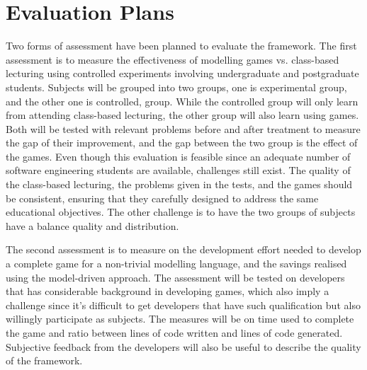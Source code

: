 \documentclass[conference]{IEEEtran}
\begin{document}
\section{Evaluation Plans}
\label{Evaluation Plans}
Two forms of assessment have been planned to evaluate the framework. The first assessment is to measure the effectiveness of modelling games vs. class-based lecturing using controlled experiments involving undergraduate and postgraduate students. Subjects will be grouped into two groups, one is experimental group, and the other one is controlled, group. While the controlled group will only learn from attending class-based lecturing, the other group will also learn using games. Both will be tested with relevant problems before and after treatment to measure the gap of their improvement, and the gap between the two group is the effect of the games. Even though this evaluation is feasible since an adequate number of software engineering students are available, challenges still exist. The quality of the class-based lecturing, the problems given in the tests, and the games should be consistent, ensuring that they carefully designed to address the same educational objectives. The other challenge is to have the two groups of subjects have a balance quality and distribution. 
  
The second assessment is to measure on the development effort needed to develop a complete game for a non-trivial modelling language, and the savings realised using the model-driven approach. The assessment will be tested on developers that has considerable background in developing games, which also imply a challenge since it's difficult to get developers that have such qualification but also willingly participate as subjects. The measures will be on time used to complete the game and ratio between lines of code written and lines of code generated. Subjective feedback from the developers will also be useful to describe the quality of the framework.  
  
\end{document}
